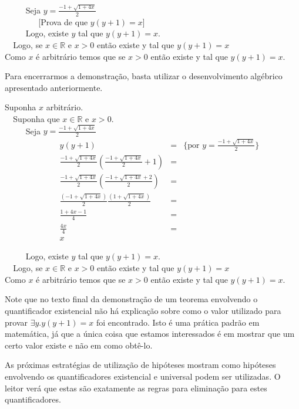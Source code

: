 \begin{Example}
\begin{flushleft}
\verb|     |Seja $y = \frac{-1 + \sqrt{1 + 4x}}{2}$\\
\verb|        |[Prova de que $y(y+1) = x$]\\
\verb|     |Logo, existe $y$ tal que $y(y+1) = x$.\\
\verb|  |Logo, se $x \in \mathbb{R}$ e $x> 0$ então existe y tal que
$y(y+1) = x$\\
Como $x$ é arbitrário temos que se $x > 0$ então existe y tal que
$y(y+1) = x$.
\end{flushleft}
Para encerrarmos a demonstração, basta utilizar o desenvolvimento
algébrico apresentado anteriormente.
\begin{flushleft}
Suponha $x$ arbitrário.\\
\verb|  |Suponha que $x \in \mathbb{R}$ e $x> 0$.\\
\verb|     |Seja $y = \frac{-1 + \sqrt{1 + 4x}}{2}$\\
\[
\begin{array}{llcl}
\,\,\,\,\,& y(y+1) & = &\{\text{por }y = \frac{-1 + \sqrt{1 + 4x}}{2}\}\\
 &\frac{-1 + \sqrt{1 + 4x}}{2}\left(\frac{-1 + \sqrt{1 + 4x}}{2} +
  1\right) & = &\\
& \frac{-1 + \sqrt{1 + 4x}}{2}\left(\frac{-1 + \sqrt{1 + 4x} + 2}{2}
\right) & = \\
& \frac{(-1 + \sqrt{1 + 4x})}{2}\frac{(1 + \sqrt{1 + 4x})}{2} & =\\
& \frac{1 + 4x - 1}{4} & =\\
& \frac{4x}{4} & = \\
& x
\end{array}
\]

\verb|     |Logo, existe $y$ tal que $y(y+1) = x$.\\
\verb|  |Logo, se $x \in \mathbb{R}$ e $x> 0$ então existe y tal que
$y(y+1) = x$\\
Como $x$ é arbitrário temos que se $x > 0$ então existe y tal que
$y(y+1) = x$.
\end{flushleft}
\end{Example}

Note que no texto final da demonstração de um teorema envolvendo o
quantificador existencial não há explicação sobre como o valor
utilizado para provar $\exists y. y (y + 1) = x$ foi encontrado. Isto
é uma prática padrão em matemática, já que a única coisa que estamos
interessados é em mostrar que um certo valor existe e não em como
obtê-lo.

As próximas estratégias de utilização de hipóteses mostram como
hipóteses envolvendo os quantificadores existencial e universal podem
ser utilizadas. O leitor verá que estas são exatamente as regras para
eliminação para estes quantificadores.

